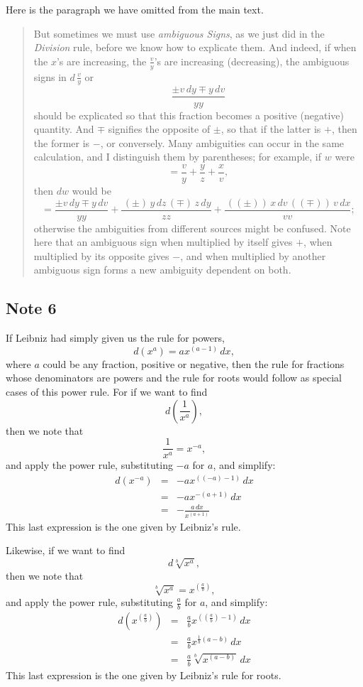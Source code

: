 \documentclass[polutonikogreek,english,twoside,openright]{article}
\newlength{\oldjot}
\begin{document}
Here is the paragraph we have omitted from the main text.
\begin{quote}
  But sometimes we must use {\em ambiguous Signs}, as we just did in
  the {\em Division} rule, before we know how to explicate them.  And
  indeed, if when the $x$'s are increasing, the $\frac{v}{y}$'s are
  increasing (decreasing), the ambiguous signs in $d\,\frac{v}{y}$ or
$$\frac{\pm v\,dy \mp y\,dv}{yy}$$ should be explicated so that this fraction
becomes a positive (negative) quantity.  And $\mp$ signifies the
opposite of $\pm$, so that if the latter is $+$, then the former is
$-$, or conversely.  Many ambiguities can occur in the same
calculation, and I distinguish them by parentheses; for example, if
$w$ were
$$=\frac{v}{y} + \frac{y}{z} +\frac{x}{v},$$ then $dw$ would be
$$= \frac{\pm v\,dy \mp y\,dv}{yy} + \frac{\,(\pm)\, y\,dz \,(\mp)\,
  z\,dy}{zz} + \frac{\,(\!(\pm)\!)\, x\,dv \,(\!(\mp)\!)\,
  v\,dx}{vv};$$ otherwise the ambiguities from different sources might
be confused.  Note here that an ambiguous sign when multiplied by
itself gives $+$, when multiplied by its opposite gives $-$, and when
multiplied by another ambiguous sign forms a new ambiguity dependent
on both.
\end{quote}





\subsection*{Note 6}
\label{cnm6}

If Leibniz had simply given us the rule for powers,
$$d(x^a) = ax^{(a-1)}\,dx,$$
where $a$ could be any fraction, positive or negative, then the rule
for fractions whose denominators are powers and the rule for roots
would follow as special cases of this power rule.  For if we want to
find
$$d\left(\frac{1}{x^a}\right),$$
then we note that 
$$\frac{1}{x^a} = x^{-a},$$
and apply the power rule, substituting $-a$ for $a$, and simplify:
\begin{eqnarray*}
d(x^{-a}) & = & -ax^{((-a)-1)}\,dx \\
& = & -ax^{-(a+1)}\,dx\\
& = & -\frac{a\,dx}{x^{(a+1)}}
\end{eqnarray*}
This last expression is the one given by Leibniz's rule.

Likewise, if we want to find
$$d\sqrt[b]{x^a},$$
then we note that
$$\sqrt[b]{x^a} = x^{(\frac{a}{b})},$$
and apply the power rule, substituting $\frac{a}{b}$ for $a$, and simplify:
\setlength{\jot}{1.5ex}
\begin{eqnarray*}
d(x^{(\frac{a}{b})}) & = & \frac{a}{b}x^{((\frac{a}{b})-1)}\,dx \\
& = & \frac{a}{b}x^{\frac{1}{b}(a-b)}\,dx\\
& = & \frac{a}{b}\sqrt[b]{x^{(a-b)}}\,dx
\end{eqnarray*}
\setlength{\jot}{\oldjot}
This last expression is the one given by Leibniz's rule for roots.
\end{document}
